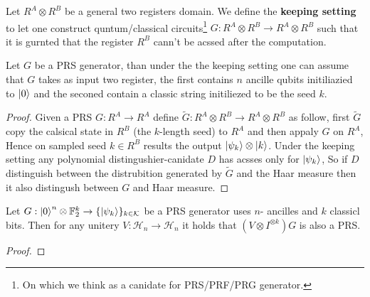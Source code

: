 \documentclass[manuscript,screen,review]{acmart}
\begin{document}
\begin{definition} Let $R^{A}\otimes R^{B}$ be a general two registers domain. We define the \textbf{keeping setting} to let one construct quntum/classical circuits\footnote{On which we think as a canidate for PRS/PRF/PRG generator.} $G : R^{A}\otimes R^{B} \rightarrow R^{A} \otimes R^{B}$ such that it is gurnted that the register $R^{B}$ cann't be acssed after the computation.   
\end{definition}

\begin{claim}
  Let $G$ be a PRS generator, than under the the keeping setting one can assume that $G$ takes as input two register, the first contains $n$ ancille qubits initiliazied to $\ket{0}$ and the seconed contain a classic string initiliezed to be the seed $k$.  
\end{claim}

\begin{proof}
  Given a PRS $G : R^{A} \rightarrow R^{A}$ define $\tilde{G} : R^{A} \otimes R^{B} \rightarrow R^{A} \otimes R^{B}$ as follow, first $\tilde{G}$ copy the calsical state in $R^{B}$ (the $k$-length seed) to $R^{A}$ and then appaly $G$ on $R^{A}$, Hence on sampled seed $k \in R^{B}$ results the output $ \ket{\psi_{k}}\otimes\ket{k}$. Under the keeping setting any polynomial distingushier-canidate $D$ has acsses only for $\ket{\psi_{k}}$, So if $D$ distinguish between the distrubition generated by $\tilde{G}$ and the Haar measure then it also distingush between $G$ and Haar measure. 
\end{proof}

\begin{claim}
  Let $G : \ket{0}^{n} \otimes \mathbb{F}_{2}^{k} \rightarrow \{ \ket{\psi_{k}} \}_{k \in \mathcal{K}}$ be a PRS generator uses $n$- ancilles and $k$ classicl bits. Then for any unitery $V: \mathcal{H}_{n} \rightarrow \mathcal{H}_{n}$ it holds that $(V \otimes I^{\otimes k} ) G$ is also a PRS.
\end{claim}
\begin{proof}
   
\end{proof}
\end{document}
